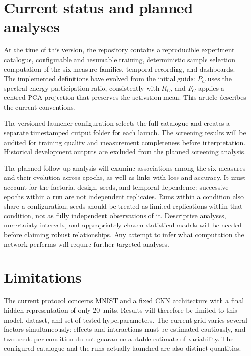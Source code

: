 \documentclass[11pt,a4paper]{article}
\begin{document}
\section{Current status and planned analyses}

At the time of this version, the repository contains a reproducible experiment catalogue, configurable and resumable training, deterministic sample selection, computation of the six measure families, temporal recording, and dashboards. The implemented definitions have evolved from the initial guide: $P_C$ uses the spectral-energy participation ratio, consistently with $R_C$, and $F_C$ applies a centred PCA projection that preserves the activation mean. This article describes the current conventions.

The versioned launcher configuration selects the full catalogue and creates a separate timestamped output folder for each launch. The screening results will be audited for training quality and measurement completeness before interpretation. Historical development outputs are excluded from the planned screening analysis.

The planned follow-up analysis will examine associations among the six measures and their evolution across epochs, as well as links with loss and accuracy. It must account for the factorial design, seeds, and temporal dependence: successive epochs within a run are not independent replicates. Runs within a condition also share a configuration; seeds should be treated as limited replications within that condition, not as fully independent observations of it. Descriptive analyses, uncertainty intervals, and appropriately chosen statistical models will be needed before claiming robust relationships. Any attempt to infer what computation the network performs will require further targeted analyses.

\section{Limitations}

The current protocol concerns MNIST and a fixed CNN architecture with a final hidden representation of only 20 units. Results will therefore be limited to this model, dataset, and set of tested hyperparameters. The current grid varies several factors simultaneously; effects and interactions must be estimated cautiously, and two seeds per condition do not guarantee a stable estimate of variability. The configured catalogue and the runs actually launched are also distinct quantities.
\end{document}
